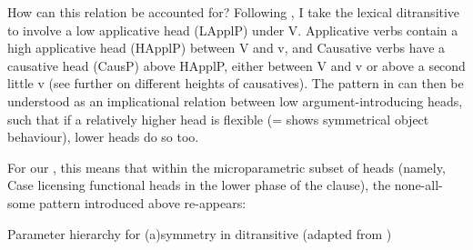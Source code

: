 \documentclass[output=paper]{langsci/langscibook}
\begin{document}
How can this relation be accounted for? Following \citet{Pylkkanen2008}, I take
the lexical ditransitive to involve a low applicative head (LApplP) under V.
Applicative verbs contain a high applicative head (HApplP) between V and v, and
Causative verbs have a causative head (CausP) above HApplP, either between V
and v or above a second little v (see further \citealt{Pylkkanen2008} on
different heights of causatives). The pattern in  can then be
understood as an implicational relation between low argument-introducing heads,
such that if a relatively higher head is flexible (= shows symmetrical object
behaviour), lower heads do so too.

For our , this means that within the
microparametric subset of heads (namely, Case
licensing
functional heads in the lower phase of the clause), the none-all-some pattern
introduced above re-appears:

\ea Parameter hierarchy for (a)symmetry in
    ditransitive  (adapted from \citealt{vanderWal2017})\\
\z
{}
\end{document}
